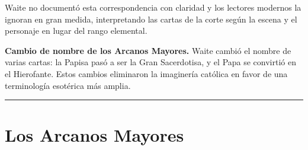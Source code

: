 Waite no documentó esta correspondencia con claridad y los lectores modernos la ignoran en gran medida, interpretando las cartas de la corte según la escena y el personaje en lugar del rango elemental.

\textbf{Cambio de nombre de los Arcanos Mayores.} Waite cambió el nombre de varias cartas: la Papisa pasó a ser la Gran Sacerdotisa, y el Papa se convirtió en el Hierofante. Estos cambios eliminaron la imaginería católica en favor de una terminología esotérica más amplia.

\begin{center}\rule{0.5\linewidth}{0.5pt}\end{center}

\section{Los Arcanos Mayores}\label{the-major-arcana}

